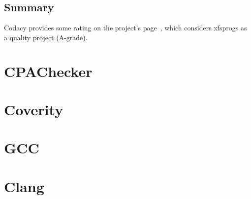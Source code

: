 \subsection{Summary}
Codacy provides some rating on the project's page~\cite{codacyXfsprogs},
which considers xfsprogs as a quality project (A-grade).


\section{CPAChecker}\label{chap:results:cpachecker}

\section{Coverity}\label{chap:results:coverity}

\section{GCC}\label{chap:results:gcc}

\section{Clang}\label{chap:results:clang}


